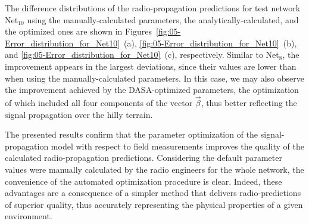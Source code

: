 The difference distributions of the radio-propagation predictions
for test network Net$_{10}$ using the manually-calculated parameters,
the analytically-calculated, and the optimized ones are shown in Figures~\ref{fig:05-Error_distribution_for_Net10}~(a),
\ref{fig:05-Error_distribution_for_Net10}~(b), and \ref{fig:05-Error_distribution_for_Net10}~(c),
respectively. Similar to Net$_{8}$, the improvement appears in the
largest deviations, since their values are lower than when using the
manually-calculated parameters. In this case, we may also observe
the improvement achieved by the DASA-optimized parameters, the optimization
of which included all four components of the vector $\vec{\beta}$,
thus better reflecting the signal propagation over the hilly terrain.

The presented results confirm that the parameter optimization of the
signal-propagation model with respect to field measurements improves
the quality of the calculated radio-propagation predictions. Considering
the default parameter values were manually calculated by the radio
engineers for the whole network, the convenience of the automated
optimization procedure is clear. Indeed, these advantages are a consequence
of a simpler method that delivers radio-predictions of superior quality,
thus accurately representing the physical properties of a given environment.

